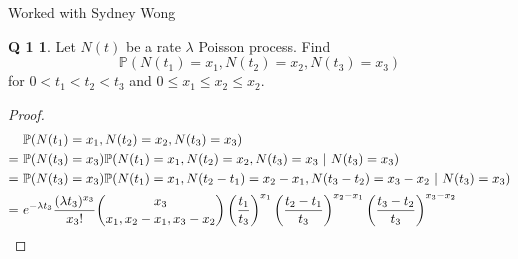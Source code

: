 \documentclass[12pt]{article}
\newcommand{\p}{\mathbb{P}}
\theoremstyle{definition}
\newtheorem*{prob1}{Q 1}
\begin{document}
\noindent Worked with Sydney Wong
\begin{prob1}
Let $N(t)$ be a rate $\lambda$ Poisson process.  Find $$\p(N(t_1) = x_1, N(t_2) = x_2, N(t_3) = x_3)$$ for $0 < t_1 < t_2 < t_3$ and $0 \leq x_1 \leq x_2 \leq x_2$.
\end{prob1}

\begin{proof}

\begin{align*}
& \p(N(t_1) = x_1, N(t_2) = x_2, N(t_3) = x_3)
\\
= \ & \p(N(t_3) = x_3) \p(N(t_1) = x_1, N(t_2) = x_2, N(t_3) = x_3 \ | \ N(t_3) = x_3)
\\
= \ & \p(N(t_3) = x_3) \p(N(t_1) = x_1, N(t_2-t_1) = x_2-x_1, N(t_3-t_2) = x_3-x_2 \ | \ N(t_3) = x_3)
\\
= \ & e^{-\lambda t_3} \dfrac{(\lambda t_3) ^ {x_3}}{x_3!} \dbinom{x_3}{x_1,x_2-x_1,x_3-x_2} \left(\dfrac{t_1}{t_3}\right)^{x_1} \left(\dfrac{t_2-t_1}{t_3}\right)^{x_2-x_1} \left( \dfrac{t_3-t_2}{t_3} \right)^{x_3-x_2}
\end{align*}
\end{proof}
\end{document}
